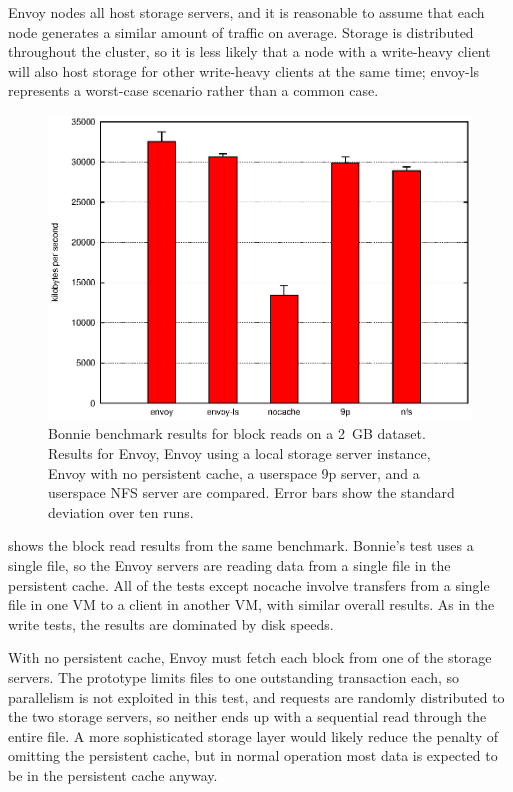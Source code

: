Envoy nodes all host storage servers, and it is reasonable to assume that each node generates a similar amount of traffic on average. Storage is distributed throughout the cluster, so it is less likely that a node with a write-heavy client will also host storage for other write-heavy clients at the same time; envoy-ls represents a worst-case scenario rather than a common case.

\begin{figure}[t]
\centering
\includegraphics[width=\figwidth]{figures/bonnie-druid1-read}
\caption[Bonnie benchmark results for block reads]{Bonnie benchmark results for block reads on a 2~GB dataset. Results for Envoy, Envoy using a local storage server instance, Envoy with no persistent cache, a userspace 9p server, and a userspace NFS server are compared. Error bars show the standard deviation over ten runs.}
\label{fig:bonnie-druid1-read}
\end{figure}

 shows the block read results from the same benchmark. Bonnie's test uses a single file, so the Envoy servers are reading data from a single file in the persistent cache. All of the tests except nocache involve transfers from a single file in one VM to a client in another VM, with similar overall results. As in the write tests, the results are dominated by disk speeds.

With no persistent cache, Envoy must fetch each block from one of the storage servers. The prototype limits files to one outstanding transaction each, so parallelism is not exploited in this test, and requests are randomly distributed to the two storage servers, so neither ends up with a sequential read through the entire file. A more sophisticated storage layer would likely reduce the penalty of omitting the persistent cache, but in normal operation most data is expected to be in the persistent cache anyway.

